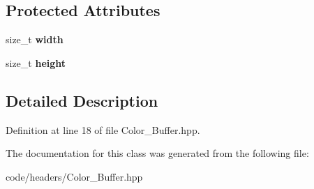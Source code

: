 \subsection*{Protected Attributes}
\begin{DoxyCompactItemize}
\item 
\mbox{\label{classprzurro_1_1_color___buffer_a5a3318b4b55d64bfbf995f7fb48409ff}} 
size\+\_\+t {\bfseries width}
\item 
\mbox{\label{classprzurro_1_1_color___buffer_aff79d2f730c2359544ece39d626c0c72}} 
size\+\_\+t {\bfseries height}
\end{DoxyCompactItemize}


\subsection{Detailed Description}


Definition at line 18 of file Color\+\_\+\+Buffer.\+hpp.



The documentation for this class was generated from the following file\+:\begin{DoxyCompactItemize}
\item 
code/headers/Color\+\_\+\+Buffer.\+hpp\end{DoxyCompactItemize}
